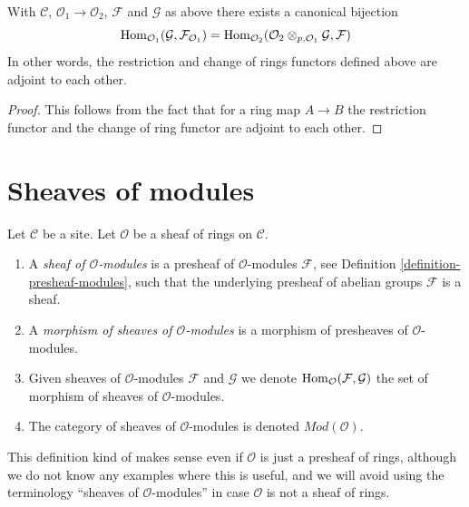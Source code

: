 \begin{lemma}
\label{lemma-adjointness-tensor-restrict-presheaves}
With $\mathcal{C}$, $\mathcal{O}_1 \to \mathcal{O}_2$, $\mathcal{F}$ and
$\mathcal{G}$ as above there exists a canonical bijection
$$
\mathop{\mathrm{Hom}}\nolimits_{\mathcal{O}_1}(\mathcal{G}, \mathcal{F}_{\mathcal{O}_1})
=
\mathop{\mathrm{Hom}}\nolimits_{\mathcal{O}_2}(
\mathcal{O}_2 \otimes_{p, \mathcal{O}_1} \mathcal{G},
\mathcal{F}
)
$$
In other words, the restriction and change of rings functors defined
above are adjoint to each other.
\end{lemma}

\begin{proof}
This follows from the fact that for a ring map
$A \to B$ the restriction functor and the change
of ring functor are adjoint to each other.
\end{proof}


\section{Sheaves of modules}
\label{section-sheaves-modules}

\begin{definition}
\label{definition-sheaf-modules}
Let $\mathcal{C}$ be a site.
Let $\mathcal{O}$ be a sheaf of rings on $\mathcal{C}$.
\begin{enumerate}
\item A {\it sheaf of $\mathcal{O}$-modules} is a presheaf
of $\mathcal{O}$-modules $\mathcal{F}$,
see Definition \ref{definition-presheaf-modules},
such that the underlying presheaf of abelian groups $\mathcal{F}$
is a sheaf.
\item A {\it morphism of sheaves of $\mathcal{O}$-modules}
is a morphism of presheaves of $\mathcal{O}$-modules.
\item Given sheaves of $\mathcal{O}$-modules
$\mathcal{F}$ and $\mathcal{G}$ we denote
$\mathop{\mathrm{Hom}}\nolimits_\mathcal{O}(\mathcal{F}, \mathcal{G})$
the set of morphism of sheaves of $\mathcal{O}$-modules.
\item The category of sheaves of $\mathcal{O}$-modules
is denoted $\textit{Mod}(\mathcal{O})$.
\end{enumerate}
\end{definition}

\noindent
This definition kind of makes sense even if $\mathcal{O}$ is just a
presheaf of rings, although we do not know any examples where
this is useful, and we will avoid using the terminology
``sheaves of $\mathcal{O}$-modules''
in case $\mathcal{O}$ is not a sheaf of rings.



